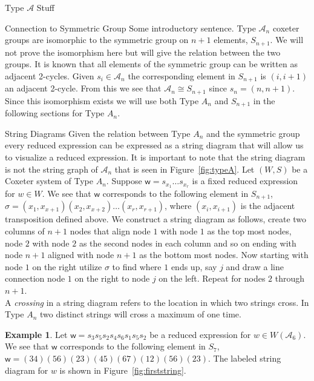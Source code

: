 \documentclass[11pt]{amsart}
\theoremstyle{definition}
\newtheorem{example}[theorem]{Example}
\numberwithin{equation}{section}
\newcommand{\A}{\mathcal{A}}
\renewcommand{\(}{\left(}
\renewcommand{\)}{\right)}
\newcommand{\w}{\mathsf{w}}
\begin{document}
\begin{section}{Type $\A$ Stuff}

\begin{subsection}{Connection to Symmetric Group}
Some introductory sentence. Type $\A_n$ coxeter groups are isomorphic to the symmetric group on $n+1$ elements, $S_{n+1}$. We will not prove the isomorphism here but will give the relation between the two groups. It is known that all elements of the symmetric group can be written as adjacent 2-cycles. Given $s_i \in \A_n$ the corresponding element in $S_{n+1}$ is $(i, i+1)$ an adjacent 2-cycle. From this we see that $\A_n \cong S_{n+1}$ since $s_n=(n, n+1)$. Since this isomorphism exists we will use both Type $A_n$ and $S_{n+1}$ in the following sections for Type $A_n$. 
\end{subsection}

\begin{subsection}{String Diagrams}
Given the relation between Type $A_n$ and the symmetric group every reduced expression can be expressed as a string diagram that will allow us to visualize a reduced expression. It is important to note that the string diagram is not the string graph of $\A_n$ that is seen in Figure~\ref{fig:typeA}. Let $(W,S)$ be a Coxeter system of Type $A_n$. Suppose $\w=s_{x_1} \ldots s_{x_r}$ is a fixed reduced expression for $w \in W$. We see that $\w$ corresponds to the following element in $S_{n+1}$, $\sigma=(x_1,x_{x+1})(x_2,x_{x+2}) \ldots (x_r,x_{r+1})$, where $(x_i,x_{i+1})$ is the adjacent transposition defined above. We construct a string diagram as follows, create two columns of $n+1$ nodes that align node $1$ with node $1$ as the top most nodes, node $2$ with node $2$ as the second nodes in each column and so on ending with node $n+1$ aligned with node $n+1$ as the bottom most nodes. Now starting with node $1$ on the right utilize $\sigma$ to find where $1$ ends up, say $j$ and draw a line connection node $1$ on the right to node $j$ on the left. Repeat for nodes $2$ through $n+1$. \\
A \emph{crossing} in a string diagram refers to the location in which two strings cross. In Type $A_n$ two distinct strings will cross a maximum of one time. 
\begin{example}\label{ex:first string}
Let $\w=s_3 s_5 s_2 s_4 s_6 s_1 s_5 s_2$ be a reduced expression for $w \in W(\A_6)$. We see that $\w$ corresponds to the following element in $S_7$,~$\w=(34)(56)(23)(45)(67)(12)(56)(23)$. The labeled string diagram for $w$ is shown in Figure~\ref{fig:firststring}.\\	
\begin{center}
\end{center}
\end{example}
\end{subsection}
\end{section}
\end{document}
